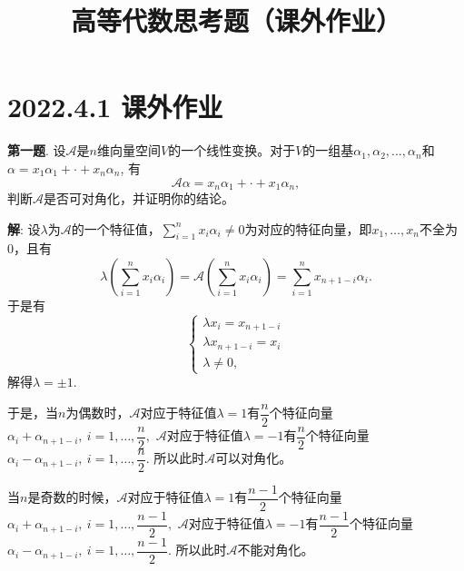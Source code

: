 
\renewcommand{\newpageorvspace}{\vspace{2em}}

\title{高等代数思考题（课外作业）}

\author{}
\date{}



\maketitle

\section{2022.4.1 课外作业}

{\bf 第一题}. 设$\mathscr{A}$是$n$维向量空间$V$的一个线性变换。对于$V$的一组基$\alpha_1, \alpha_2, \ldots, \alpha_n$和$\alpha = x_1\alpha_1 + \cdot + x_n\alpha_n$, 有
$$\mathscr{A}\alpha = x_n\alpha_1 + \cdot + x_1\alpha_n,$$
判断$\mathscr{A}$是否可对角化，并证明你的结论。

{\bf 解}: 设$\lambda$为$\mathscr{A}$的一个特征值，$\sum\limits_{i=1}^n x_i \alpha_i \neq 0$为对应的特征向量，即$x_1,\ldots,x_n$不全为0，且有
$$\lambda(\sum\limits_{i=1}^n x_i \alpha_i) = \mathscr{A}(\sum\limits_{i=1}^n x_i \alpha_i) = \sum\limits_{i=1}^n x_{n+1-i} \alpha_i.$$
于是有
$$
\begin{cases}
\lambda x_i = x_{n+1-i} \\
\lambda x_{n+1-i} = x_i \\
\lambda \neq 0,
\end{cases}
$$
解得$\lambda = \pm 1$. 

于是，当$n$为偶数时，$\mathscr{A}$对应于特征值$\lambda = 1$有$\dfrac{n}{2}$个特征向量$\alpha_i + \alpha_{n+1-i}, ~ i = 1, \ldots, \dfrac{n}{2},$ $\mathscr{A}$对应于特征值$\lambda = -1$有$\dfrac{n}{2}$个特征向量$\alpha_i - \alpha_{n+1-i}, ~ i = 1, \ldots, \dfrac{n}{2}.$ 所以此时$\mathscr{A}$可以对角化。

当$n$是奇数的时候，$\mathscr{A}$对应于特征值$\lambda = 1$有$\dfrac{n-1}{2}$个特征向量$\alpha_i + \alpha_{n+1-i}, ~ i = 1, \ldots, \dfrac{n-1}{2},$ $\mathscr{A}$对应于特征值$\lambda = -1$有$\dfrac{n-1}{2}$个特征向量$\alpha_i - \alpha_{n+1-i}, ~ i = 1, \ldots, \dfrac{n-1}{2}.$ 所以此时$\mathscr{A}$不能对角化。

